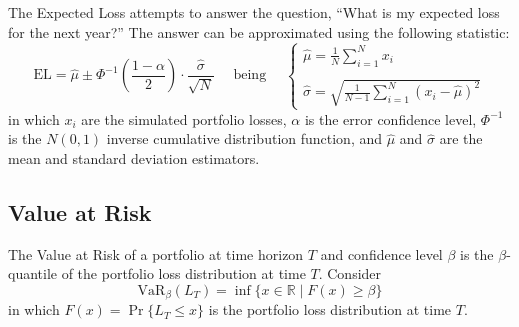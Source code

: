 \documentclass[11pt,fleqn]{book} %
\begin{document}
The Expected Loss attempts to answer the question, ``What is my expected 
loss for the next year?'' The answer can be approximated using the following 
statistic:
\begin{displaymath}
	\text{EL} = \widehat{\mu} \pm \Phi^{-1}\left(\frac{1-\alpha}{2}\right) \cdot \frac{\widehat{\sigma}}{\sqrt{N}}
	\quad \text{ being } \quad
	\left\{
	\begin{array}{l}
		\displaystyle
		\widehat{\mu} = \frac{1}{N} \sum_{i=1}^{N} x_i \\
		\\
		\displaystyle
		\widehat{\sigma} =
		\sqrt{\frac{1}{N-1} \sum_{i=1}^{N} \left( x_i - \widehat{\mu} \right)^2}
	\end{array}
	\right.
\end{displaymath}
in which $x_i$ are the simulated portfolio losses, $\alpha$ is the error 
confidence level, $\Phi^{-1}$ is the $N(0,1)$ inverse cumulative distribution 
function, and $\widehat{\mu}$ and $\widehat{\sigma}$ are the mean and standard 
deviation estimators.

\subsection{Value at Risk}

\begin{definition}
	The Value at Risk of a portfolio at time horizon $T$ and confidence level 
	$\beta$ is the $\beta$-quantile of the portfolio loss distribution at time 
	$T$. Consider
	\begin{displaymath}
		\text{VaR}_\beta(L_T) = \inf\{x \in \mathbb{R} \mid F(x) \ge \beta \}
	\end{displaymath}
	in which $F(x)=\Pr\{L_T \le x\}$ is the portfolio loss distribution at 
	time $T$.
\end{definition}
\end{document}
